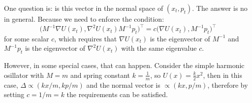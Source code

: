\documentclass[hidelinks]{article}[12pt]
\begin{document}
One question is: is this vector in the normal space of $(x_t, p_t)$. The answer is no in general. Because we need to enforce the condition:
\[
\Big(M^{-1} \nabla U(x_t), \nabla^2 U(x_t) M^{-1} p_t\Big)^\top = c \Big(\nabla U(x_t), M^{-1} p_t\Big)^\top 
\]
for some scalar $c$, which requires that $\nabla U(x_t)$ is the eigenvector of $M^{-1}$ and $M^{-1}p_t$ is the eigenvector of $\nabla^2 U(x_t)$ with the same eigenvalue $c$.

However, in some special cases, that can happen. Consider the simple harmonic osillator with $M = m$ and spring constant $k = \frac1m$, so $U(x) = \frac{k}{2} x^2$, then in this case, $\Delta \propto (kx/m, kp/m) $ and the normal vector is $ \propto (kx, p/m)$, therefore by setting $c = 1/m = k$ the requirements can be satisfied.
\end{document}
